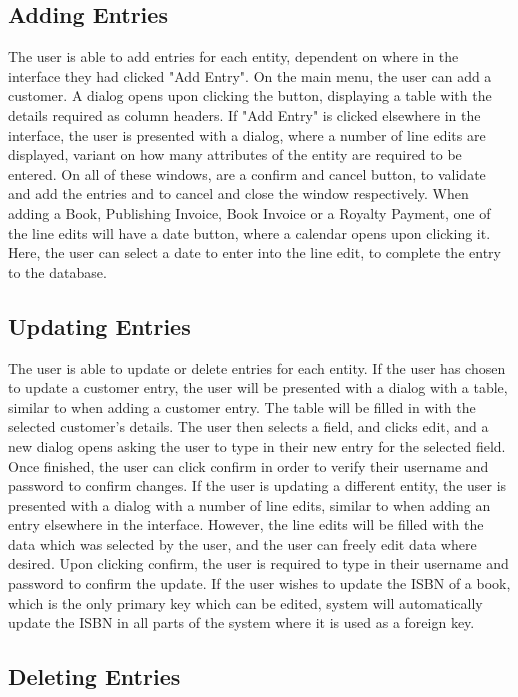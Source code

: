 \subsection{Adding Entries}

The user is able to add entries for each entity, dependent on where in the interface they had clicked "Add Entry". On the main menu, the user can add a customer. A dialog opens upon clicking the button, displaying a table with the details required as column headers. If "Add Entry" is clicked elsewhere in the interface, the user is presented with a dialog, where a number of line edits are displayed, variant on how many attributes of the entity are required to be entered. On all of these windows, are a confirm and cancel button, to  validate and add the entries and to cancel and close the window respectively. When adding a Book, Publishing Invoice, Book Invoice or a Royalty Payment, one of the line edits will have a date button, where a calendar opens upon clicking it. Here, the user can select a date to enter into the line edit, to complete the entry to the database.

\subsection{Updating Entries}

The user is able to update or delete entries for each entity. If the user has chosen to update a customer entry, the user will be presented with a dialog with a table, similar to when adding a customer entry. The table will be filled in with the selected customer's details. The user then selects a field, and clicks edit, and a new dialog opens asking the user to type in their new entry for the selected field. Once finished, the user can click confirm in order to verify their username and password to confirm changes. If the user is updating a different entity, the user is presented with a dialog with a number of line edits, similar to when adding an entry elsewhere in the interface. However, the line edits will be filled with the data which was selected by the user, and the user can freely edit data where desired. Upon clicking confirm, the user is required to type in their username and password to confirm the update. If the user wishes to update the ISBN of a book, which is the only primary key which can be edited, system will automatically update the ISBN in all parts of the system where it is used as a foreign key.

\subsection{Deleting Entries}

